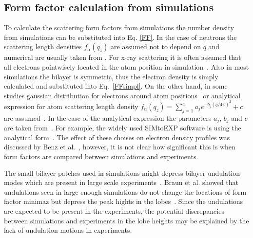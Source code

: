 \documentclass[aps,prl,superscriptaddress,twocolumn]{revtex4}
\begin{document}
\onecolumngrid
{}


\twocolumngrid

\subsection{Form factor calculation from simulations}
To calculate the scattering form factors from simulations the number density from
simulations can be substituted into Eq. \ref{FF}. In the case of neutrons the scattering 
length densities $f_\alpha(q_z)$ are assumed not to depend on $q$ and numerical are usually 
taken from \cite{??}. For x-ray scattering it is often assumed that all electrons pointwisely 
located in the atom position in simulation~\cite{??}. Also in most simulations the bilayer is symmetric,
thus the electron density is simply calculated and substituted into Eq.~\ref{FFsimpl}. 
On the other hand, in some studies gaussian distribution for electrons around atom positions~\cite{benz05} 
or analytical expression for atom scattering length density $f_\alpha(q_z)=\sum_{j=1}^4a_je^{-b_j(q/4\pi)^2}+c$
are assumed~\cite{benz05,kucerka10,??}. In the case of the analytical expression the parameters 
$a_j$, $b_j$ and $c$ are taken from~\cite{??}. For example, the widely used SIMtoEXP software is using
the analytical form~\cite{kucerka10}. The effect of these choises on electron density profiles was discussed
by Benz et al.~\cite{benz05}, however, it is not clear how significant this is when form factors are
compared between simulations and experiments.

The small bilayer patches used in simulations might depress bilayer undulation modes which are present in large 
scale experiments~\cite{braun14}. Braun et al. showed that undulations seen in large enough simulations do
not change the locations of form factor minimaz but depress the peak hights in the lobes~\cite{braun14}.
Since the undulations are expected to be present in the experiments, the potential discrepancies 
between simulations and experiments in the lobe heights may be explained by the lack of undulation 
motions in experiments.
\end{document}

